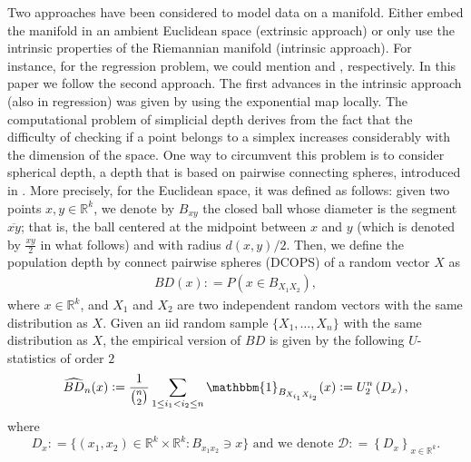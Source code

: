 \documentclass[a4paper]{article}
\def\defeq{\mathrel{\mathop:}=}
\newcommand{\eqdef}{\mathrel{\mathop:}=}
\numberwithin{equation}{section}
\def\defeq{\mathrel{\mathop:}=}
\newcommand{\M}{\mbox{$\mathcal{M}$}}
\newcommand{\I}{\mathbbm{1}}
\begin{document}
Two approaches have been considered to model  data  on a manifold. Either  embed the manifold in an ambient Euclidean space (extrinsic approach) or only use the intrinsic properties of the Riemannian manifold (intrinsic approach).  For instance, for  the regression problem, we could mention \cite{lin2016} and \cite{zhu2009}, respectively. In this paper we follow the second approach. The first advances in the intrinsic approach (also in regression) was given by \cite{pelletier2006}  using the exponential map locally.
The computational problem of simplicial depth derives from the fact that the difficulty of checking if a point belongs to a simplex increases considerably with the dimension of the space. One way to circumvent this problem is to consider spherical depth,  a depth that is based on pairwise connecting spheres, introduced in \cite{elmore2006}.  More precisely, for the Euclidean space, it was defined  as follows:
given two points $x,y \in \mathbb R^k$, we denote by $B_{xy}$ the closed ball whose diameter is the segment $\overline{xy}$; that is, the ball  centered at the midpoint between $x$ and $y$ (which is denoted by $\frac{xy}{2}$ in what follows) and with radius $d(x,y)/2$. Then, we define the population depth by connect pairwise spheres (DCOPS) of a random vector $X$ as
\begin{equation}
\begin{aligned}
BD(x) \eqdef P\left( x \in B_{X_1 X_2} \right),
\end{aligned}
\label{defprofundidad_euc}
\end{equation}
where $x \in \mathbb R^k$, and  $X_1$ and $X_2$ are two independent random vectors with the same distribution as  $X$.
Given an iid random sample  $ \{X_1, \ldots, X_n\}$ with the same distribution as $X$,  the empirical version of $BD$ is given by the following $U$-statistics of order $2$
\begin{equation}
\widehat{BD}_n(x) \defeq \frac{1}{\binom{n}{2}}\sum_{1 \leq i_1 < i_2 \leq n} \I_{B_{X_{i_1} X_{i_2}}}(x)\defeq U^n_2 \left( D_x\right),
\label{estimadorprofundidad_euc}
\end{equation}
where
\begin{equation}
\label{D}
D_x \defeq \{ (x_1,x_2) \in \mathbb{R}^k \times \mathbb{R}^k: B_{x_1 x_2} \ni x \} \textrm{ and we denote } \mathcal{D} \defeq \left\{ D_x \right \}_{x \in \mathbb{R}^k}.
\end{equation}
\end{document}
